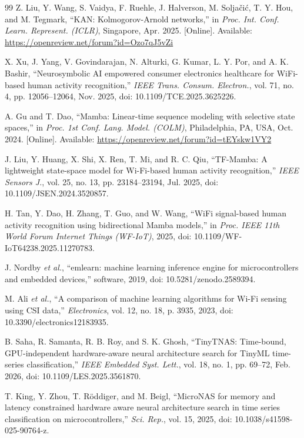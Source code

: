 \documentclass{ieeeaccess}
\begin{document}
\begin{thebibliography}{99}
Z. Liu, Y. Wang, S. Vaidya, F. Ruehle, J. Halverson, M. Solja\v{c}i\'c, T. Y. Hou, and M. Tegmark, ``KAN: Kolmogorov-Arnold networks,'' in \emph{Proc. Int. Conf. Learn. Represent. (ICLR)}, Singapore, Apr. 2025. [Online]. Available: \url{https://openreview.net/forum?id=Ozo7qJ5vZi}

X. Xu, J. Yang, V. Govindarajan, N. Alturki, G. Kumar, L. Y. Por, and A. K. Bashir, ``Neurosymbolic AI empowered consumer electronics healthcare for WiFi-based human activity recognition,'' \emph{IEEE Trans. Consum. Electron.}, vol. 71, no. 4, pp. 12056--12064, Nov. 2025, doi: 10.1109/TCE.2025.3625226.

A. Gu and T. Dao, ``Mamba: Linear-time sequence modeling with selective state spaces,'' in \emph{Proc. 1st Conf. Lang. Model. (COLM)}, Philadelphia, PA, USA, Oct. 2024. [Online]. Available: \url{https://openreview.net/forum?id=tEYskw1VY2}

J. Liu, Y. Huang, X. Shi, X. Ren, T. Mi, and R. C. Qiu, ``TF-Mamba: A lightweight state-space model for Wi-Fi-based human activity recognition,'' \emph{IEEE Sensors J.}, vol. 25, no. 13, pp. 23184--23194, Jul. 2025, doi: 10.1109/JSEN.2024.3520857.

H. Tan, Y. Dao, H. Zhang, T. Guo, and W. Wang, ``WiFi signal-based human activity recognition using bidirectional Mamba models,'' in \emph{Proc. IEEE 11th World Forum Internet Things (WF-IoT)}, 2025, doi: 10.1109/WF-IoT64238.2025.11270783.

J. Nordby \emph{et al.}, ``emlearn: machine learning inference engine for microcontrollers and embedded devices,'' software, 2019, doi: 10.5281/zenodo.2589394.

M. Ali \emph{et al.}, ``A comparison of machine learning algorithms for Wi-Fi sensing using CSI data,'' \emph{Electronics}, vol. 12, no. 18, p. 3935, 2023, doi: 10.3390/electronics12183935.

B. Saha, R. Samanta, R. B. Roy, and S. K. Ghosh, ``TinyTNAS: Time-bound, GPU-independent hardware-aware neural architecture search for TinyML time-series classification,'' \emph{IEEE Embedded Syst. Lett.}, vol. 18, no. 1, pp. 69--72, Feb. 2026, doi: 10.1109/LES.2025.3561870.

T. King, Y. Zhou, T. R\"oddiger, and M. Beigl, ``MicroNAS for memory and latency constrained hardware aware neural architecture search in time series classification on microcontrollers,'' \emph{Sci. Rep.}, vol. 15, 2025, doi: 10.1038/s41598-025-90764-z.


\end{thebibliography}
\end{document}
